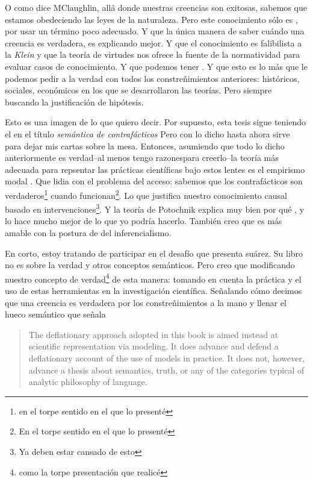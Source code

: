O como dice MClaughlin, allá donde nuestras creencias son exitosas, sabemos que estamos obedeciendo las leyes de la naturaleza.
Pero este conocimiento sólo es , por usar un término poco adecuado.
Y que la única manera de saber cuándo una creencia es verdadera, es explicando mejor.
Y que el conocimiento es falibilista a la \emph{Klein} y que la teoría de virtudes nos ofrece la fuente de la normatividad para evaluar casos de conocimiento.
Y que podemos tener .
Y que esto es lo más que le podemos pedir a la verdad con todos los constreñimientos anteriores: históricos, sociales, económicos en los que se desarrollaron las teorías.
Pero siempre buscando la justificación de hipótesis.

Esto es una imagen de lo que quiero decir.
Por supuesto, esta tesis sigue teniendo el en el título \emph{semántica de contrafácticos}
Pero con lo dicho hasta ahora sirve para dejar mis cartas sobre la mesa.
Entonces, asumiendo que todo lo dicho anteriormente es verdad--al menos tengo razonespara creerlo--la teoría más adecuada para repsentar las prácticas científicas bajo estos lentes es el empirismo modal \textcite{russelllogical}.
Que lidia con el problema del acceso: sabemos que los contrafácticos son verdaderos\footnote{en el torpe sentido en el que lo presenté} cuando funcionan\footnote{En el torpe sentido en el que lo presenté}.
Lo que justifica nuestro conocimiento causal basado en intervenciones\footnote{Ya deben estar cansado de esto}.
Y la teoría de Potochnik explica muy bien por qué \parencite{Potochnik2017-POTIAT-3}, y lo hace mucho mejor de lo que yo podría hacerlo.
También creo que es más amable con la postura de \textcite{suarez2004} del inferencialismo.


En corto, estoy tratando de participar en el desafío que presenta suárez.
Su libro no es sobre la verdad y otros conceptos semánticos.
Pero creo que modificando nuestro concepto de verdad\footnote{como la torpe presentación que realicé} de esta manera: tomando en cuenta la práctica y el uso de estas herramientas en la investigación científica.
Señalando cómo decimos que una creencia es verdadera por los constreñimientos a la mano y llenar el hueco semántico que señala \textcite[][p. 16]{suarez2004}

\begin{quote}
	The deflationary approach adopted in this book is aimed instead at scientific representation via modeling.
	It does advance and defend a deflationary account of the use of models in practice.
	It does not, however, advance  a thesis about semantics, truth, or any of the categories typical of analytic  philosophy of language.
\end{quote}


